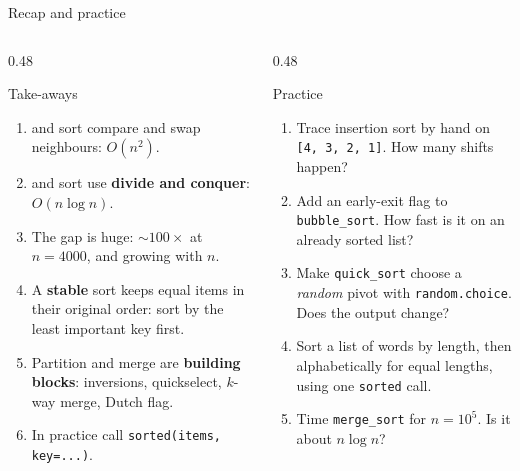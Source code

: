 \documentclass[aspectratio=169,10pt]{beamer}
\begin{document}
\begin{frame}{Recap and practice}
\begin{columns}[T]
\begin{column}{0.48\textwidth}
\begin{block}{Take-aways}
{\small
\begin{enumerate}\setlength\itemsep{3pt}
\item {} and  sort compare and swap neighbours: $O(n^2)$.
\item {} and  sort use \textbf{divide and conquer}: $O(n\log n)$.
\item The gap is huge: ${\sim}100\times$ at $n=4000$, and growing with $n$.
\item A \textbf{stable} sort keeps equal items in their original order: sort by the least important key first.
\item Partition and merge are \textbf{building blocks}: inversions, quickselect, $k$-way merge, Dutch flag.
\item In practice call \texttt{sorted(items, key=...)}.
\end{enumerate}}
\end{block}
\end{column}
\begin{column}{0.48\textwidth}
\begin{block}{Practice}
{\small
\begin{enumerate}\setlength\itemsep{3pt}
\item Trace insertion sort by hand on \texttt{[4, 3, 2, 1]}. How many shifts happen?
\item Add an early-exit flag to \texttt{bubble\_sort}. How fast is it on an already sorted list?
\item Make \texttt{quick\_sort} choose a \emph{random} pivot with \texttt{random.choice}. Does the output change?
\item Sort a list of words by length, then alphabetically for equal lengths, using one \texttt{sorted} call.
\item Time \texttt{merge\_sort} for $n = 10^5$. Is it about $n\log n$?
\end{enumerate}}
\end{block}
\end{column}
\end{columns}
\end{frame}
\end{document}
